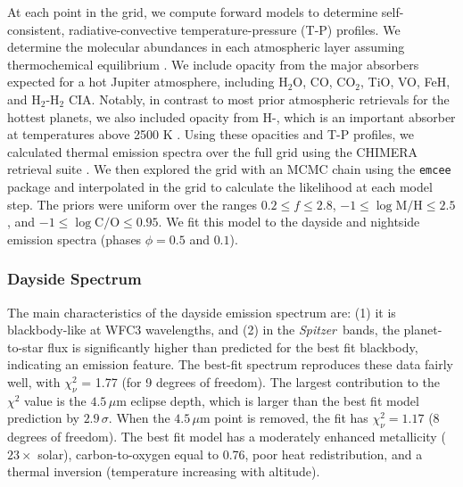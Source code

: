 \documentclass[twocolumn, trackchanges]{aastex61}
\newcommand{\project}[1]{\textsl{#1}}
\newcommand{\Spitzer}{\project{Spitzer}}
\begin{document}
At each point in the grid, we compute forward models to determine self-consistent, radiative-convective temperature-pressure (T-P) profiles. We determine the molecular abundances in each atmospheric layer assuming thermochemical equilibrium \citep[calculated with the NASA CEA routine;][]{gordon94}.  We include opacity from the major absorbers expected for a hot Jupiter atmosphere, including H$_2$O, CO, CO$_2$, TiO, VO, FeH, and H$_2$-H$_2$ CIA. Notably, in contrast to most prior atmospheric retrievals for the hottest planets, we also included opacity from H-, which is an important absorber at temperatures above 2500 K \citep{arcangeli18, parmentier18}.  Using these opacities and T-P profiles, we calculated thermal emission spectra over the full grid using the CHIMERA retrieval suite \citep[described in][]{line13a, line14}.  We then explored the grid with an MCMC chain using the \texttt{emcee} package \citep{foremanmackey13} and interpolated in the grid to calculate the likelihood at each model step. The priors were uniform over the ranges $0.2 \le f \le 2.8$, $-1\le \log{\mathrm{M/H}} \le 2.5$, and $-1 \le \log{\mathrm{C/O}} \le 0.95$.  We fit this model to the dayside and nightside emission spectra (phases $\phi = 0.5$ and $0.1$). 

\subsubsection{Dayside Spectrum}
The main characteristics of the dayside emission spectrum are: (1) it is blackbody-like at WFC3 wavelengths, and (2) in the \Spitzer\ bands, the planet-to-star flux is significantly higher than predicted for the best fit blackbody, indicating an emission feature.  The best-fit spectrum reproduces these data fairly well, with $\chi^2_\nu$ = 1.77 (for 9 degrees of freedom). The largest contribution to the $\chi^2$ value is the $4.5\,\mu$m eclipse depth, which is larger than the best fit model prediction by $2.9\,\sigma$. When the $4.5\,\mu$m point is removed, the fit has $\chi^2_\nu = 1.17$ (8 degrees of freedom).  The best fit model has a moderately enhanced metallicity ($23\times$ solar), carbon-to-oxygen equal to 0.76, poor heat redistribution, and a thermal inversion (temperature increasing with altitude).
\end{document}
